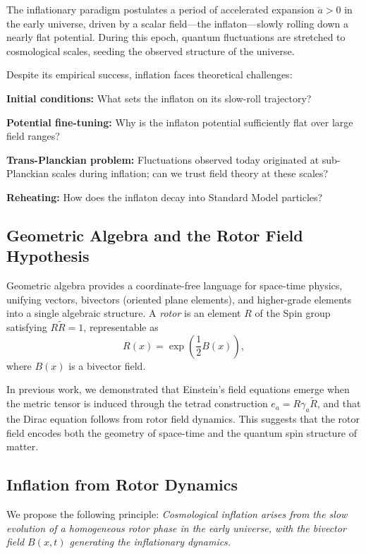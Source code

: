 \documentclass[11pt,a4paper]{article}
\numberwithin{equation}{section}
\theoremstyle{plain}
\theoremstyle{definition}
\theoremstyle{remark}
\begin{document}
The inflationary paradigm postulates a period of accelerated expansion $\ddot{a} > 0$ in the early universe, driven by a scalar field---the inflaton---slowly rolling down a nearly flat potential. During this epoch, quantum fluctuations are stretched to cosmological scales, seeding the observed structure of the universe.

Despite its empirical success, inflation faces theoretical challenges:

\textbf{Initial conditions:} What sets the inflaton on its slow-roll trajectory?

\textbf{Potential fine-tuning:} Why is the inflaton potential sufficiently flat over large field ranges?

\textbf{Trans-Planckian problem:} Fluctuations observed today originated at sub-Planckian scales during inflation; can we trust field theory at these scales?

\textbf{Reheating:} How does the inflaton decay into Standard Model particles?

\subsection{Geometric Algebra and the Rotor Field Hypothesis}

Geometric algebra provides a coordinate-free language for space-time physics, unifying vectors, bivectors (oriented plane elements), and higher-grade elements into a single algebraic structure. A \emph{rotor} is an element $R$ of the Spin group satisfying $R\widetilde{R} = 1$, representable as
\begin{equation}
R(x) = \exp\left(\frac{1}{2}B(x)\right),
\end{equation}
where $B(x)$ is a bivector field.

In previous work, we demonstrated that Einstein's field equations emerge when the metric tensor is induced through the tetrad construction $e_a = R\gamma_a\widetilde{R}$, and that the Dirac equation follows from rotor field dynamics. This suggests that the rotor field encodes both the geometry of space-time and the quantum spin structure of matter.

\subsection{Inflation from Rotor Dynamics}

We propose the following principle: \emph{Cosmological inflation arises from the slow evolution of a homogeneous rotor phase in the early universe, with the bivector field $B(x,t)$ generating the inflationary dynamics.}
\end{document}
